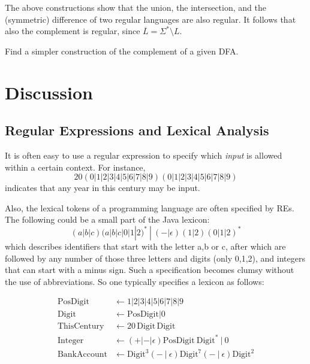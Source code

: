 The above constructions show that the union, the intersection, and the
(symmetric) difference of two regular languages are also regular. It
follows that also the complement is regular, since
%
$\overline{L} = \Sigma^* \setminus L$.

\begin{exercise}
Find a simpler construction of the complement of a given DFA.
\end{exercise}

\section{Discussion}
\subsection{Regular Expressions and Lexical Analysis}
It is often easy to use a regular expression to specify which {\em
  input} is allowed within a certain context. For instance,
\begin{equation*}
20(0|1|2|3|4|5|6|7|8|9)(0|1|2|3|4|5|6|7|8|9)
\end{equation*}
indicates that any year in this century may be input.

Also, the lexical tokens of a programming language are often specified
by REs. The following could be a small part of the Java lexicon:
\begin{equation*}
	(a|b|c)(a|b|c|0|1|2)^*~|~(-|\epsilon)(1|2)(0|1|2)^*
\end{equation*}
which describes identifiers that start with the letter a,b or c, after which are
followed by any number of those three letters and digits (only 0,1,2),
and integers that can start with a minus sign. Such a specification becomes clumsy without the use of abbreviations. So one typically specifies a lexicon as follows:

\begin{align*}
	\text{PosDigit} &\leftarrow 1|2|3|4|5|6|7|8|9  \\
	\text{Digit} &\leftarrow \text{PosDigit}|0 \\
	\text{ThisCentury} &\leftarrow 20\,\text{Digit}\,\text{Digit} \\
	\text{Integer} &\leftarrow (+|-|\epsilon)\text{PosDigit}~\text{Digit}^*~|~0 \\
	\text{BankAccount} &\leftarrow \text{Digit}^3(-~|~\epsilon)\text{Digit}^7(-~|~\epsilon)\text{Digit}^2
\end{align*}

